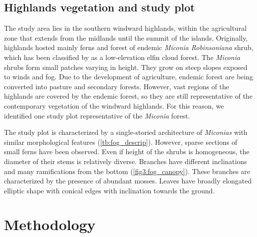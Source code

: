 \documentclass[a4paper,12pt]{article}
\begin{document}
\begin{linenumbers}
\subsection{Highlands vegetation and study plot}
The study area lies in the southern windward highlands, within the agricultural zone that extends from the midlands until the summit of the islands. Originally, highlands hosted mainly ferns and forest of endemic \emph{Miconia Robinsoniana} shrub, which has been classified by \cite{Pryetetal2012a} as a low-elevation elfin cloud forest. The \emph{Miconia} shrubs form small patches varying in height. They grow on steep slopes exposed to winds and fog. Due to the development of agriculture, endemic forest are being converted into pasture and secondary forests. However, vast regions of the highlands are covered by the endemic forest, so they are still representative of the contemporary vegetation of the windward highlands. For this reason, we identified one study plot representative of the \emph{Miconia} forest. 

The study plot is characterized by a single-storied architecture of \emph{Miconias} with similar morphological features (\autoref{tb:fog_descrip}). However, sparse sections of small ferns have been observed. Even if height of the shrubs is homogeneous, the diameter of their stems is relatively diverse. Branches have different inclinations and many ramifications from the bottom (\autoref{fig3:fog_canopy}). These branches are characterized by the presence of abundant mosses. Leaves have broadly elongated elliptic shape with conical edges with inclination towards the ground.





\section{Methodology}


\end{linenumbers}
\end{document}
